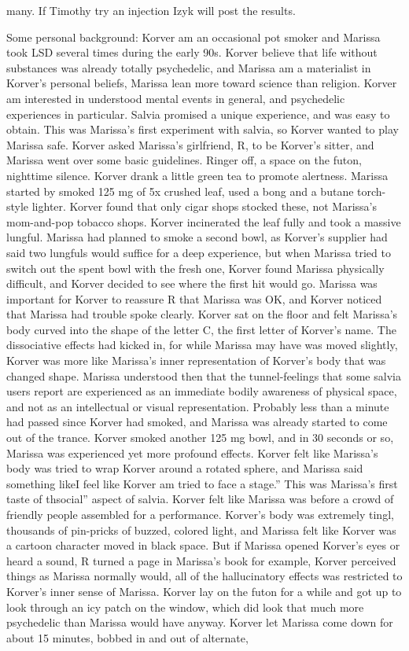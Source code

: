 \documentclass[12pt]{book}
\begin{document}
many. If Timothy try an injection Izyk will post the results.



Some personal background: Korver am an occasional pot smoker and Marissa took LSD several times during the early 90s. Korver believe that life without substances was already totally psychedelic, and Marissa am a materialist in Korver's personal beliefs, Marissa lean more toward science than religion. Korver am interested in understood mental events in general, and psychedelic experiences in particular. Salvia promised a unique experience, and was easy to obtain. This was Marissa's first experiment with salvia, so Korver wanted to play Marissa safe. Korver asked Marissa's girlfriend, R, to be Korver's sitter, and Marissa went over some basic guidelines. Ringer off, a space on the futon, nighttime silence. Korver drank a little green tea to promote alertness. Marissa started by smoked 125 mg of 5x crushed leaf, used a bong and a butane torch-style lighter. Korver found that only cigar shops stocked these, not Marissa's mom-and-pop tobacco shops. Korver incinerated the leaf fully and took a massive lungful. Marissa had planned to smoke a second bowl, as Korver's supplier had said two lungfuls would suffice for a deep experience, but when Marissa tried to switch out the spent bowl with the fresh one, Korver found Marissa physically difficult, and Korver decided to see where the first hit would go. Marissa was important for Korver to reassure R that Marissa was OK, and Korver noticed that Marissa had trouble spoke clearly. Korver sat on the floor and felt Marissa's body curved into the shape of the letter C, the first letter of Korver's name. The dissociative effects had kicked in, for while Marissa may have was moved slightly, Korver was more like Marissa's inner representation of Korver's body that was changed shape. Marissa understood then that the tunnel-feelings that some salvia users report are experienced as an immediate bodily awareness of physical space, and not as an intellectual or visual representation. Probably less than a minute had passed since Korver had smoked, and Marissa was already started to come out of the trance. Korver smoked another 125 mg bowl, and in 30 seconds or so, Marissa was experienced yet more profound effects. Korver felt like Marissa's body was tried to wrap Korver around a rotated sphere, and Marissa said something likeI feel like Korver am tried to face a stage.'' This was Marissa's first taste of thsocial'' aspect of salvia. Korver felt like Marissa was before a crowd of friendly people assembled for a performance. Korver's body was extremely tingl, thousands of pin-pricks of buzzed, colored light, and Marissa felt like Korver was a cartoon character moved in black space. But if Marissa opened Korver's eyes or heard a sound, R turned a page in Marissa's book for example, Korver perceived things as Marissa normally would, all of the hallucinatory effects was restricted to Korver's inner sense of Marissa. Korver lay on the futon for a while and got up to look through an icy patch on the window, which did look that much more psychedelic than Marissa would have anyway. Korver let Marissa come down for about 15 minutes, bobbed in and out of alternate, 
\end{document}
